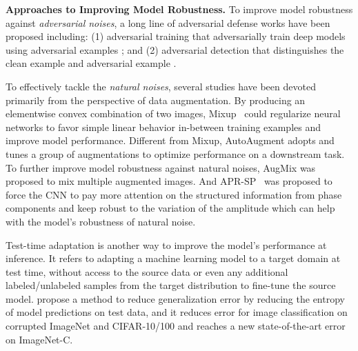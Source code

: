 


\textbf{Approaches to Improving Model Robustness.} To improve model robustness against \emph{adversarial noises}, a long line of adversarial defense works have been proposed including: (1) adversarial training that adversarially train deep models using adversarial examples \cite{goodfellow2014explaining,PGD,tramer2017ensemble,shafahi2019adversarial,liu2021ANP,zhang2021interpreting}; and (2) adversarial detection that distinguishes the clean example and adversarial example \cite{grosse2017statistical,gong2017adversarial,jiang2020attack}. 

To effectively tackle the \emph{natural noises}, several studies have been devoted primarily from the perspective of data augmentation. By producing an elementwise convex combination of two images, Mixup~\cite{mixup2017} could regularize neural networks to favor simple linear behavior in-between training examples and improve model performance. Different from Mixup, AutoAugment \cite{2018AutoAugment} adopts and tunes a group of augmentations to optimize performance on a downstream task. To further improve model robustness against natural noises, AugMix \cite{hendrycks2020augmix} was proposed to mix multiple augmented images. And APR-SP~\cite{chen2021amplitude} was proposed to force the CNN to pay more attention on the structured information from phase components and keep robust to the variation of the amplitude which can help with the model's robustness of natural noise.

Test-time adaptation is another way to improve the model's performance at inference. It refers to adapting a machine learning model to a target domain at test time, without access to the source data or even any additional labeled/unlabeled samples from the target distribution to fine-tune the source model. \cite{tent} propose a method to reduce generalization error by reducing the entropy of model predictions on test data, and it reduces error for image classification on corrupted ImageNet and CIFAR-10/100 and reaches a new state-of-the-art error on ImageNet-C.




